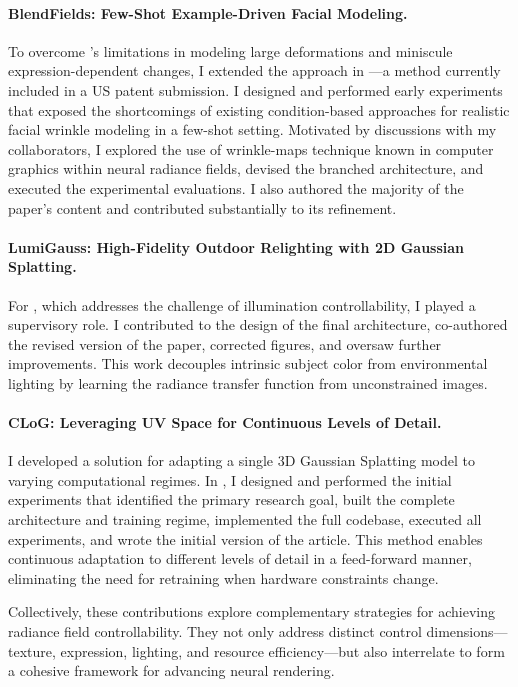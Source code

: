   \paragraph{BlendFields: Few-Shot Example-Driven Facial Modeling.}
    To overcome \conerf's limitations in modeling large deformations and miniscule
    expression-dependent changes, I extended the approach in \blendfields---a
    method currently included in a US patent submission.
    I designed and performed early experiments that exposed the shortcomings of
    existing condition-based approaches for realistic facial wrinkle modeling in a
    few-shot setting.
    Motivated by discussions with my collaborators, I explored the use of
    wrinkle-maps technique known in computer graphics within neural radiance
    fields, devised the branched architecture, and executed the experimental
    evaluations.
    I also authored the majority of the paper's content and contributed
    substantially to its refinement.

  \paragraph{LumiGauss: High-Fidelity Outdoor Relighting with 2D Gaussian Splatting.}
    For \lumigauss, which addresses the challenge of illumination controllability,
    I played a supervisory role.
    I contributed to the design of the final architecture, co-authored the revised
    version of the paper, corrected figures, and oversaw further improvements.
    This work decouples intrinsic subject color from environmental lighting by
    learning the radiance transfer function from unconstrained images.

  \paragraph{CLoG: Leveraging UV Space for Continuous Levels of Detail.}
    I developed a solution for adapting a single 3D Gaussian Splatting model to
    varying computational regimes.
    In \clog, I designed and performed the initial experiments that identified the
    primary research goal, built the complete architecture and training regime,
    implemented the full codebase, executed all experiments, and wrote the initial
    version of the article.
    This method enables continuous adaptation to different levels of detail in a
    feed-forward manner, eliminating the need for retraining when hardware
    constraints change.

    Collectively, these contributions explore complementary strategies for
    achieving radiance field controllability.
    They not only address distinct control dimensions—texture, expression,
    lighting, and resource efficiency—but also interrelate to form a cohesive
    framework for advancing neural rendering.

